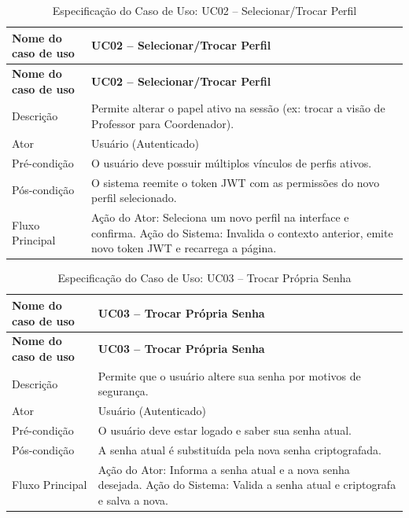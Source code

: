 \fonteautores

\vspace{\baselineskip}

\Needspace{0.48\textheight}
\begin{longtable}{|L{4.5cm}|L{10.5cm}|}
\caption{Especificação do Caso de Uso: UC02 -- Selecionar/Trocar Perfil} \\
\hline
\textbf{Nome do caso de uso} & \textbf{UC02 -- Selecionar/Trocar Perfil} \\
\hline
\endfirsthead
\hline
\textbf{Nome do caso de uso} & \textbf{UC02 -- Selecionar/Trocar Perfil} \\
\hline
\endhead
Descrição       & Permite alterar o papel ativo na sessão (ex: trocar a visão de Professor para Coordenador). \\
\hline
Ator            & Usuário (Autenticado) \\
\hline
Pré-condição    & O usuário deve possuir múltiplos vínculos de perfis ativos. \\
\hline
Pós-condição    & O sistema reemite o token JWT com as permissões do novo perfil selecionado. \\
\hline
Fluxo Principal & Ação do Ator: Seleciona um novo perfil na interface e confirma. Ação do Sistema: Invalida o contexto anterior, emite novo token JWT e recarrega a página. \\
\hline
\end{longtable}

\fonteautores

\vspace{\baselineskip}

\Needspace{0.48\textheight}
\begin{longtable}{|L{4.5cm}|L{10.5cm}|}
\caption{Especificação do Caso de Uso: UC03 -- Trocar Própria Senha} \\
\hline
\textbf{Nome do caso de uso} & \textbf{UC03 -- Trocar Própria Senha} \\
\hline
\endfirsthead
\hline
\textbf{Nome do caso de uso} & \textbf{UC03 -- Trocar Própria Senha} \\
\hline
\endhead
Descrição       & Permite que o usuário altere sua senha por motivos de segurança. \\
\hline
Ator            & Usuário (Autenticado) \\
\hline
Pré-condição    & O usuário deve estar logado e saber sua senha atual. \\
\hline
Pós-condição    & A senha atual é substituída pela nova senha criptografada. \\
\hline
Fluxo Principal & Ação do Ator: Informa a senha atual e a nova senha desejada. Ação do Sistema: Valida a senha atual e criptografa e salva a nova. \\
\hline
\end{longtable}

